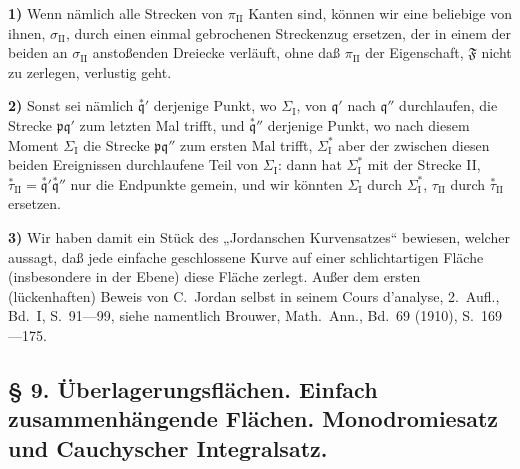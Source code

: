 \documentclass{article}
\begin{document}
\textbf{1)} Wenn nämlich alle Strecken von $\pi_{\mathrm{II}}$ Kanten sind, können wir eine beliebige von ihnen, $\sigma_{\mathrm{II}}$, durch einen einmal gebrochenen Streckenzug ersetzen, der in einem der beiden an $\sigma_{\mathrm{II}}$ anstoßenden Dreiecke verläuft, ohne daß $\pi_{\mathrm{II}}$ der Eigenschaft, $\mathfrak{F}$ nicht zu zerlegen, verlustig geht.

\textbf{2)} Sonst sei nämlich $\overset{*}{\mathfrak{q}}'$ derjenige Punkt, wo $\varSigma_{\mathrm{I}}$, von $\mathfrak{q}'$ nach $\mathfrak{q}''$ durchlaufen, die Strecke $\mathfrak{p}\mathfrak{q}'$ zum letzten Mal trifft, und $\overset{*}{\mathfrak{q}}''$ derjenige Punkt, wo nach diesem Moment $\varSigma_{\mathrm{I}}$ die Strecke $\mathfrak{p}\mathfrak{q}''$ zum ersten Mal trifft, $\varSigma_{\mathrm{I}}^*$ aber der zwischen diesen beiden Ereignissen durchlaufene Teil von $\varSigma_{\mathrm{I}}$: dann hat $\varSigma_{\mathrm{I}}^*$ mit der Strecke II, $\overset{*}{\tau}_{\mathrm{II}} = \overset{*}{\mathfrak{q}}'\overset{*}{\mathfrak{q}}''$ nur die Endpunkte gemein, und wir könnten $\varSigma_{\mathrm{I}}$ durch $\varSigma_{\mathrm{I}}^*$, $\tau_{\mathrm{II}}$ durch $\overset{*}{\tau}_{\mathrm{II}}$ ersetzen.

\textbf{3)} Wir haben damit ein Stück des „Jordanschen Kurvensatzes“ bewiesen, welcher aussagt, daß jede einfache geschlossene Kurve auf einer schlichtartigen Fläche (insbesondere in der Ebene) diese Fläche zerlegt. Außer dem ersten (lückenhaften) Beweis von C.~Jordan selbst in seinem Cours d'analyse, 2.~Aufl., Bd.~I, S.~91---99, siehe namentlich Brouwer, Math.~Ann., Bd.~69 (1910), S.~169---175.

\subsection*{§ 9. Überlagerungsflächen. Einfach zusammenhängende Flächen. Monodromiesatz und Cauchyscher Integralsatz.}
\end{document}
